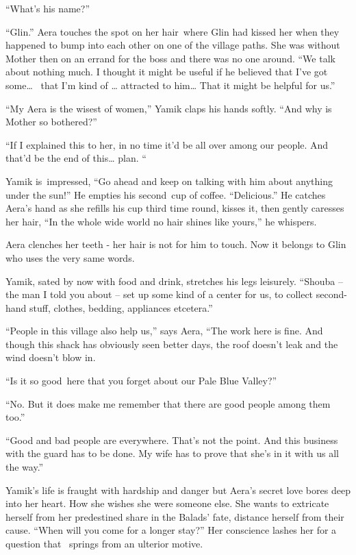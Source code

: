 \documentclass[letterpaper]{article}
\begin{document}
{}``What's his name?'' 

{}``Glin.'' Aera touches the spot on her hair~where Glin had kissed her when they happened to bump into each other on
one of the village paths. She was without Mother then on an errand for the boss and there was no one around. ``We talk
about nothing much. I thought it might be useful if he believed that I've got some{\dots} \ that I'm kind of {\dots}
attracted to him{\dots} That it might be helpful for us.'' 

{}``My Aera is the wisest of women,'' Yamik claps his hands softly. ``And why is Mother so bothered?'' 

{}``If I explained this to her, in no time it'd be all over among our people. And that'd be the end of this{\dots} plan.
``

Yamik is~impressed, ``Go ahead and keep on talking with him about anything under the sun!'' He empties his second~cup of
coffee. ``Delicious.'' He catches Aera's hand as she refills his cup third time round, kisses it, then gently caresses
her hair, ``In the whole wide world no hair shines like yours,'' he whispers.

Aera clenches her teeth - her hair is not for him to touch. Now it belongs to Glin who uses the very same words.~ 

Yamik, sated by now with food and drink, stretches his legs leisurely. ``Shouba -- the man I told you about -- set up
some kind of a center for us, to collect second-hand stuff, clothes, bedding, appliances etcetera.'' 

{}``People in this village also help us,'' says Aera, ``The work here is fine. And though this shack has obviously seen
better days, the roof doesn't leak and the wind doesn't blow in.{\textquotedbl}

{}``Is it so good~here that you forget about our Pale Blue Valley?'' 

{}``No. But it does make me remember that there are good people among them too.'' 

{}``Good and bad people are everywhere. That's not the point. And this business with the guard has to be done. My wife
has to prove that she's in it with us all the way.''

Yamik's life is fraught with hardship and danger but Aera's secret love bores deep into her heart. How she wishes she
were someone else. She wants to extricate herself from her predestined share in the Balads' fate, distance herself from
their cause. ``When will you come for a longer stay?'' Her conscience lashes her for a question that \ springs from an
ulterior motive. 
\end{document}
